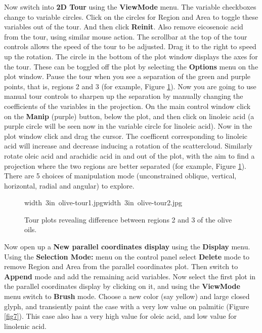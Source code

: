 \documentclass[11pt]{article}
\begin{document}
Now switch into {\bf 2D Tour} using the {\bf ViewMode} menu. The
variable checkboxes change to variable circles. Click on the circles
for Region and Area to toggle these variables out of the tour. And
then click {\bf Reinit}. Also remove eicosenoic acid from the tour,
using similar mouse action. The scrollbar at the top of the tour
controls allows the speed of the tour to be adjusted. Drag it to the
right to speed up the rotation.  The circle in the bottom of the plot
window displays the axes for the tour. These can be toggled off the
plot by selecting the {\bf Options} menu on the plot window. Pause the
tour when you see a separation of the green and purple points, that
is, regions 2 and 3 (for example, Figure \ref{fig6}). Now you are
going to use manual tour controls to sharpen up the separation by
manually changing the coefficients of the variables in the
projection. On the main control window click on the {\bf Manip}
(purple) button, below the plot, and then click on linoleic acid (a
purple circle will be seen now in the variable circle for linoleic
acid). Now in the plot window click and drag the cursor. The
coefficent corresponding to linoleic acid will increase and decrease
inducing a rotation of the scattercloud. Similarly rotate oleic acid
and arachidic acid in and out of the plot, with the aim to find a
projection where the two regions are better separated (for example,
Figure \ref{fig6}).  There are 5 choices of manipulation mode
(unconstrained oblique, vertical, horizontal, radial and angular) to
explore.

\begin{figure}[htp]
\hbox{\pdfimage width 3in {olive-tour1.jpg}\pdfimage width 3in {olive-tour2.jpg}}
\caption{Tour plots revealing difference between regions 2 and 3 of the
olive oils.}
\label{fig6}
\end{figure}

Now open up a {\bf New parallel coordinates display} using the {\bf
Display} menu. Using the {\bf Selection Mode:} menu on the control
panel select {\bf Delete} mode to remove Region and Area from the
parallel coordinates plot. Then switch to {\bf Append} mode and add
the remaining acid variables. Now select the first plot in the
parallel coordinates display by clicking on it, and using the {\bf
ViewMode} menu switch to {\bf Brush} mode. Choose a new color (say
yellow) and large closed glyph, and transiently paint the case with a
very low value on palmitic (Figure \ref{fig7}). This case also has a
very high value for oleic acid, and low value for linolenic acid.
\end{document}
